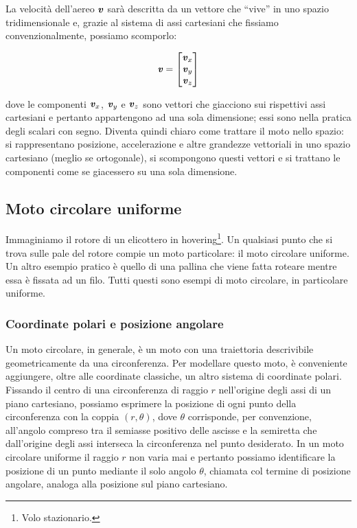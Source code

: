 La velocità dell'aereo $\textbf{\textit{v}}$ sarà descritta da un vettore che ``vive'' in uno
spazio tridimensionale e, grazie al sistema di assi cartesiani che
fissiamo convenzionalmente, possiamo scomporlo:

\[
\textbf{\textit{v}} =
\left[
\begin{matrix}
    \textbf{\textit{v}}_x\\
    \textbf{\textit{v}}_y\\
    \textbf{\textit{v}}_z   
\end{matrix}
\right]
\]

\noindent dove le componenti $\textbf{\textit{v}}_x$, $\textbf{\textit{v}}_y$ e
$\textbf{\textit{v}}_z$ sono vettori che giacciono sui rispettivi assi
cartesiani e pertanto appartengono ad una sola dimensione; essi
sono nella pratica degli scalari con segno. Diventa
quindi chiaro come trattare il moto nello spazio: si rappresentano
posizione, accelerazione e altre grandezze vettoriali in uno
spazio cartesiano (meglio se ortogonale), si scompongono questi
vettori e si trattano le componenti come se giacessero su una
sola dimensione.




\subsection{Moto circolare uniforme}
Immaginiamo il rotore di un elicottero in hovering\footnote{Volo stazionario.}.
Un qualsiasi punto che si trova sulle pale del rotore compie un moto
particolare: il moto circolare uniforme. Un altro esempio pratico è
quello di una pallina che viene fatta roteare mentre essa è fissata
ad un filo. Tutti questi sono esempi di moto circolare, in particolare
uniforme.

\subsubsection*{Coordinate polari e posizione angolare}
Un moto circolare, in generale, è un moto con una traiettoria descrivibile
geometricamente da una circonferenza. Per modellare questo moto, è
conveniente aggiungere, oltre alle coordinate classiche, un altro
sistema di coordinate polari. Fissando il centro di una circonferenza
di raggio $r$ nell'origine degli assi di un piano cartesiano, possiamo
esprimere la posizione di ogni punto della circonferenza con la coppia
$(r, \theta)$, dove $\theta$ corrisponde, per convenzione, all'angolo compreso tra
il semiasse positivo delle ascisse e la semiretta che dall'origine degli
assi interseca la circonferenza nel punto desiderato. In un moto
circolare uniforme il raggio $r$ non varia mai e pertanto possiamo
identificare la posizione di un punto mediante il solo angolo $\theta$,
chiamata col termine di posizione angolare, analoga alla posizione
sul piano cartesiano.

